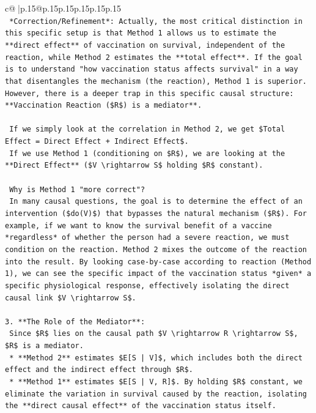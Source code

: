 \documentclass{article}
\begin{document}
{\begin{supertabular}{c@{$\;$}|p{.15\linewidth}@{}p{.15\linewidth}p{.15\linewidth}p{.15\linewidth}p{.15\linewidth}p{.15\linewidth}}
{{{\\ 
\texttt{    *Correction/Refinement*: Actually, the most critical distinction in this specific setup is that Method 1 allows us to estimate the **direct effect** of vaccination on survival, independent of the reaction, while Method 2 estimates the **total effect**. If the goal is to understand "how vaccination status affects survival" in a way that disentangles the mechanism (the reaction), Method 1 is superior. However, there is a deeper trap in this specific causal structure: **Vaccination Reaction (\$R\$) is a mediator**.} \\
\\ 
\texttt{    If we simply look at the correlation in Method 2, we get \$Total Effect = Direct Effect + Indirect Effect\$.} \\
\texttt{    If we use Method 1 (conditioning on \$R\$), we are looking at the **Direct Effect** (\$V \textbackslash{}rightarrow S\$ holding \$R\$ constant).} \\
\\ 
\texttt{    Why is Method 1 "more correct"?} \\
\texttt{    In many causal questions, the goal is to determine the effect of an intervention (\$do(V)\$) that bypasses the natural mechanism (\$R\$). For example, if we want to know the survival benefit of a vaccine *regardless* of whether the person had a severe reaction, we must condition on the reaction. Method 2 mixes the outcome of the reaction into the result. By looking case{-}by{-}case according to reaction (Method 1), we can see the specific impact of the vaccination status *given* a specific physiological response, effectively isolating the direct causal link \$V \textbackslash{}rightarrow S\$.} \\
\\ 
\texttt{3.  **The Role of the Mediator**:} \\
\texttt{    Since \$R\$ lies on the causal path \$V \textbackslash{}rightarrow R \textbackslash{}rightarrow S\$, \$R\$ is a mediator.} \\
\texttt{    *   **Method 2** estimates \$E{[}S | V{]}\$, which includes both the direct effect and the indirect effect through \$R\$.} \\
\texttt{    *   **Method 1** estimates \$E{[}S | V, R{]}\$. By holding \$R\$ constant, we eliminate the variation in survival caused by the reaction, isolating the **direct causal effect** of the vaccination status itself.} \\
\\ 
}}}
\end{supertabular}}
\end{document}
